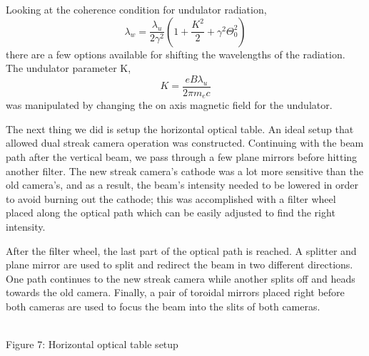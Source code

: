 \documentclass[%
 reprint,%
 amssymb, amsmath,%
 aip,cha,%
]{revtex4-1}
\begin{document}
Looking at the coherence condition for undulator radiation, 
\begin{equation}
\lambda_w = \frac{\lambda_u}{2\gamma^2} (1 + \frac{K^2}{2} + \gamma^2\Theta_0^2)
\end{equation}
there are a few options available for shifting the wavelengths of the radiation. The undulator parameter K,
\begin{equation}
K = \frac{e B \lambda_u}{2\pi m_e c}
\end{equation}
was manipulated by changing the on axis magnetic field for the undulator.

The next thing we did is setup the horizontal optical table. An ideal setup that allowed dual streak camera operation was constructed. Continuing with the beam path after the vertical beam, we pass through a few plane mirrors before hitting another filter. The new streak camera's cathode was a lot more sensitive than the old camera's, and as a result, the beam's intensity needed to be lowered in order to avoid burning out the cathode; this was accomplished with a filter wheel placed along the optical path which can be easily adjusted to find the right intensity. 

After the filter wheel, the last part of the optical path is reached. A splitter and plane mirror are used to split and redirect the beam in two different directions. One path continues to the new streak camera while another splits off and heads towards the old camera. Finally, a pair of toroidal mirrors placed right before both cameras are used to focus the beam into the slits of both cameras.
\begin{center}
 \\[0.5cm]
Figure 7: Horizontal optical table setup
\end{center}
\end{document}
